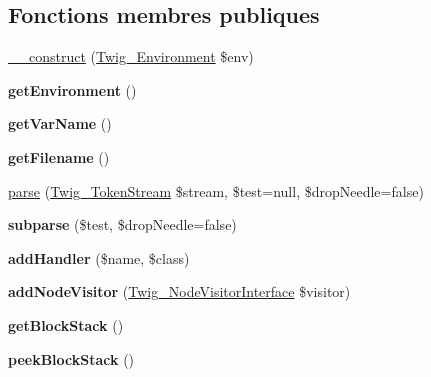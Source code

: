 \subsection*{Fonctions membres publiques}
\begin{DoxyCompactItemize}
\item 
\hyperlink{class_twig___parser_a4f8326243132c1450a81e0a817aa1be7}{\+\_\+\+\_\+construct} (\hyperlink{class_twig___environment}{Twig\+\_\+\+Environment} \$env)
\item 
{\bfseries get\+Environment} ()\hypertarget{class_twig___parser_a1a945689f9a90f9029d671ec32262d37}{}\label{class_twig___parser_a1a945689f9a90f9029d671ec32262d37}

\item 
{\bfseries get\+Var\+Name} ()\hypertarget{class_twig___parser_a01f345a64ec10225d4205181cf82c811}{}\label{class_twig___parser_a01f345a64ec10225d4205181cf82c811}

\item 
{\bfseries get\+Filename} ()\hypertarget{class_twig___parser_a2982abe8d7b767602a1485dfb4cf653d}{}\label{class_twig___parser_a2982abe8d7b767602a1485dfb4cf653d}

\item 
\hyperlink{class_twig___parser_a69f32778987edc9c0e527586b0846016}{parse} (\hyperlink{class_twig___token_stream}{Twig\+\_\+\+Token\+Stream} \$stream, \$test=null, \$drop\+Needle=false)
\item 
{\bfseries subparse} (\$test, \$drop\+Needle=false)\hypertarget{class_twig___parser_ab87dbe5da68b760af265a4fa8397d15a}{}\label{class_twig___parser_ab87dbe5da68b760af265a4fa8397d15a}

\item 
{\bfseries add\+Handler} (\$name, \$class)\hypertarget{class_twig___parser_a29fdf9b89eff2e8dc95e5774067d9b35}{}\label{class_twig___parser_a29fdf9b89eff2e8dc95e5774067d9b35}

\item 
{\bfseries add\+Node\+Visitor} (\hyperlink{interface_twig___node_visitor_interface}{Twig\+\_\+\+Node\+Visitor\+Interface} \$visitor)\hypertarget{class_twig___parser_adc294d7c409f47d2c26847601897c6db}{}\label{class_twig___parser_adc294d7c409f47d2c26847601897c6db}

\item 
{\bfseries get\+Block\+Stack} ()\hypertarget{class_twig___parser_a043c227e73dcf79ae5b24c586e48cbfc}{}\label{class_twig___parser_a043c227e73dcf79ae5b24c586e48cbfc}

\item 
{\bfseries peek\+Block\+Stack} ()\hypertarget{class_twig___parser_ac478342b47a171d7f76ab0c860e8ccd5}{}\label{class_twig___parser_ac478342b47a171d7f76ab0c860e8ccd5}


\end{DoxyCompactItemize}

